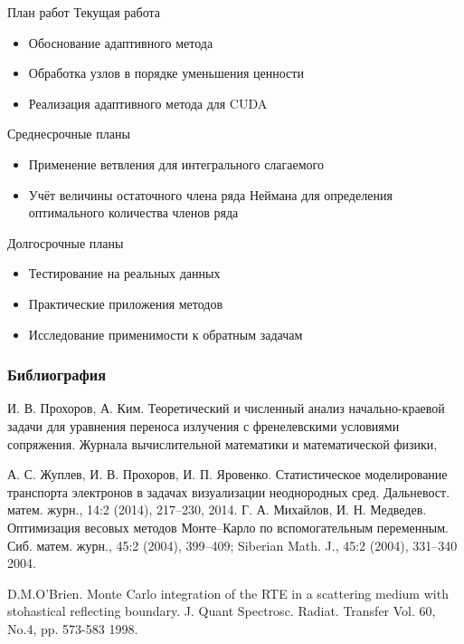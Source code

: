 \documentclass[aspectratio=169]{beamer}
\begin{document}
\begin{frame}{План работ}
  Текущая работа
  \begin{itemize}
  \item Обоснование адаптивного метода
  \item Обработка узлов в порядке уменьшения ценности \cite{4}
  \item Реализация адаптивного метода для CUDA
  \end{itemize}
  Среднесрочные планы
  \begin{itemize}
  \item Применение ветвления для интегрального слагаемого
  \item Учёт величины остаточного члена ряда Неймана для определения оптимального количества членов ряда
  \end{itemize}
  Долгосрочные планы
  \begin{itemize}
  \item Тестирование на реальных данных
  \item Практические приложения методов
  \item Исследование применимости к обратным задачам
  \end{itemize}
\end{frame}



\begin{frame}[allowframebreaks]
  \frametitle<presentation>{Библиография}
    
  \begin{thebibliography}{4}
    
  \beamertemplatebookbibitems

  \beamertemplatearticlebibitems
    И. В. Прохоров, А. Ким.
Теоретический и численный анализ начально-краевой задачи для уравнения переноса излучения с френелевскими условиями сопряжения.
    \newblock Журнала вычислительной математики и математической физики,
    
    А. С. Жуплев, И. В. Прохоров, И. П. Яровенко. 
 Статистическое моделирование транспорта электронов в задачах визуализации неоднородных сред.
    \newblock Дальневост. матем. журн., 14:2 (2014), 217–230,
    2014.
    	Г. А. Михайлов, И. Н. Медведев.
 Оптимизация весовых методов Монте–Карло по вспомогательным переменным.
    \newblock Сиб. матем. журн., 45:2 (2004), 399–409; Siberian Math. J., 45:2 (2004), 331–340
    2004.
    
    D.M.O'Brien.
 Monte Carlo integration of the RTE in a scattering medium with stohastical reflecting boundary.
    \newblock J. Quant Spectrosc. Radiat. Transfer Vol. 60, No.4, pp. 573-583
    1998.
    
  \end{thebibliography}
\end{frame}
\end{document}
